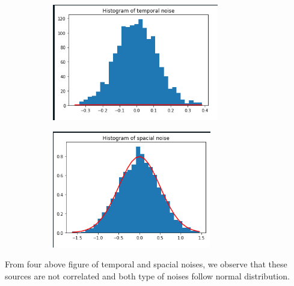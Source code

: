 \documentclass{article}
\begin{document}
\begin{figure}[H]
\newline

\begin{subfigure}{.5\textwidth}
  \centering
  \includegraphics[width=1\linewidth]{hist tt.png}  
  \label{fig:sub-third}
\end{subfigure}
\begin{subfigure}{.5\textwidth}
  \centering
  \includegraphics[width=1\linewidth]{ts hist.png} 
  \label{fig:sub-fourth}
\end{subfigure}
\label{fig:all}
\end{figure}

From four above figure of temporal and spacial noises, we observe that these sources are not correlated and both type of noises follow normal distribution.
\end{document}
